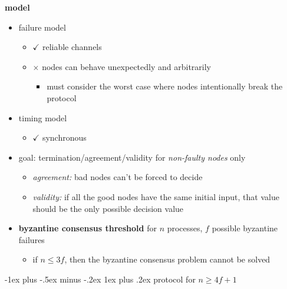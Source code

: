 \documentclass[10pt, landscape]{article}
\makeatletter
\renewcommand{\subsubsection}{\@startsection{subsubsection}{3}{0mm}%
  {-1ex plus -.5ex minus -.2ex}%
  {1ex plus .2ex}%
{\normalfont\small\bfseries}}%
\makeatother
\begin{document}
\begin{multicols*}{3}
  \textbf{model}

  \begin{itemize}
    \item failure model
      \begin{itemize}
        \item $\checkmark$ reliable channels
        \item $\times$  nodes can behave unexpectedly and arbitrarily
          \begin{itemize}
            \item must consider the worst case where nodes intentionally break the protocol
          \end{itemize}
      \end{itemize}
    \item timing model
      \begin{itemize}
        \item $\checkmark$ synchronous
      \end{itemize}
    \item goal: termination/agreement/validity for \textit{non-faulty nodes} only
      \begin{itemize}
        \item \textit{agreement:} bad nodes can't be forced to decide
        \item \textit{validity:} if all the good nodes have the same initial input, that value should be the only possible decision value 
      \end{itemize}
    \item \textbf{byzantine consensus threshold} for $n$ processes, $f$ possible byzantine failures
      \begin{itemize}
        \item if $n \leq 3f$, then the byzantine consensus problem cannot be solved
      \end{itemize}
  \end{itemize}

  \subsubsection{protocol for $n \geq 4f+1$}


\end{multicols*}
\end{document}
